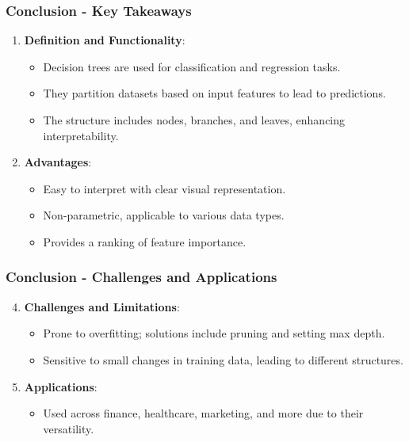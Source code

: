 \documentclass[aspectratio=169]{beamer}
\begin{document}
\begin{frame}[fragile]
  \frametitle{Conclusion - Key Takeaways}
  \begin{enumerate}
    \item \textbf{Definition and Functionality}:
      \begin{itemize}
        \item Decision trees are used for classification and regression tasks.
        \item They partition datasets based on input features to lead to predictions.
        \item The structure includes nodes, branches, and leaves, enhancing interpretability.
      \end{itemize}

    \item \textbf{Advantages}:
      \begin{itemize}
        \item Easy to interpret with clear visual representation.
        \item Non-parametric, applicable to various data types.
        \item Provides a ranking of feature importance.
      \end{itemize}
  \end{enumerate}
\end{frame}

\begin{frame}[fragile]
  \frametitle{Conclusion - Challenges and Applications}
  \begin{enumerate}
    \setcounter{enumi}{3} %
    \item \textbf{Challenges and Limitations}:
      \begin{itemize}
        \item Prone to overfitting; solutions include pruning and setting max depth.
        \item Sensitive to small changes in training data, leading to different structures.
      \end{itemize}
    
    \item \textbf{Applications}:
      \begin{itemize}
        \item Used across finance, healthcare, marketing, and more due to their versatility.
      \end{itemize}
  \end{enumerate}
\end{frame}
\end{document}

